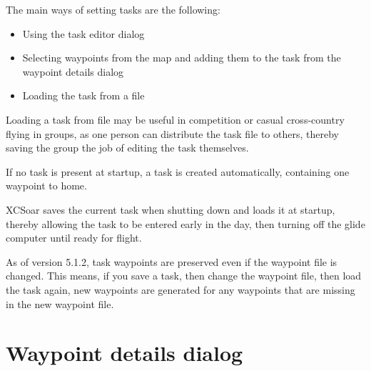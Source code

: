 \documentclass[a4paper,12pt]{refrep}
\newcommand{\InfoBox}[0]{{InfoBox}}
\begin{document}
The main ways of setting tasks are the following:
\begin{itemize}
\item Using the task editor dialog
\item Selecting waypoints from the map and adding them to the task from the
 waypoint details dialog
\item Loading the task from a file
\end{itemize}

%

\tip Loading a task from file may be useful in competition or casual
cross-country flying in groups, as one person can distribute the task
file to others, thereby saving the group the job of editing the task
themselves.

\tip If no task is present at startup, a task is created automatically,
  containing one waypoint to home.

XCSoar saves the current task when shutting down and loads it at
startup, thereby allowing the task to be entered early in the day,
then turning off the glide computer until ready for flight.

As of version 5.1.2, task waypoints are preserved even if the waypoint
file is changed.  This means, if you save a task, then change the
waypoint file, then load the task again, new waypoints are generated
for any waypoints that are missing in the new waypoint file.

\section{Waypoint details dialog}
\end{document}
